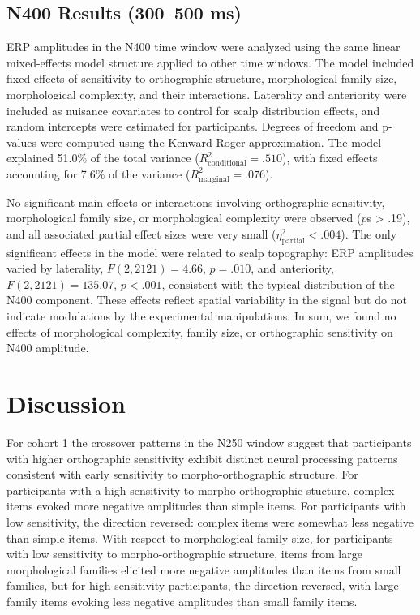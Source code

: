 \documentclass[preprint,12pt, authoryear, review]{elsarticle}
\begin{document}
\subsection{N400 Results (300--500 ms)}


ERP amplitudes in the N400 time window were analyzed using the same linear mixed-effects model structure applied to other time windows. The model included fixed effects of sensitivity to orthographic structure, morphological family size, morphological complexity, and their interactions. Laterality and anteriority were included as nuisance covariates to control for scalp distribution effects, and random intercepts were estimated for participants. Degrees of freedom and p-values were computed using the Kenward-Roger approximation. The model explained 51.0\% of the total variance ($R^2_\text{conditional} = .510$), with fixed effects accounting for 7.6\% of the variance ($R^2_\text{marginal} = .076$).

No significant main effects or interactions involving orthographic sensitivity, morphological family size, or morphological complexity were observed ($p$s > .19), and all associated partial effect sizes were very small ($\eta^2_{\text{partial}} < .004$). The only significant effects in the model were related to scalp topography: ERP amplitudes varied by laterality, $F(2, 2121) = 4.66$, $p = .010$, and anteriority, $F(2, 2121) = 135.07$, $p < .001$, consistent with the typical distribution of the N400 component. These effects reflect spatial variability in the signal but do not indicate modulations by the experimental manipulations. In sum, we found no effects of morphological complexity, family size, or orthographic sensitivity on N400 amplitude.


\section{Discussion}

For cohort 1  the crossover patterns in the N250 window suggest that participants with higher orthographic sensitivity exhibit distinct neural processing patterns consistent with early sensitivity to morpho-orthographic structure. For participants with a high sensitivity to morpho-orthographic stucture, complex items evoked more negative amplitudes than simple items. For participants with low sensitivity, the direction reversed: complex items were somewhat less negative than simple items. With respect to morphological family size, for participants with low sensitivity to morpho-orthographic structure, items from large morphological families elicited more negative amplitudes  than items from small families, but for high sensitivity participants, the direction reversed, with large family items evoking less negative amplitudes than small family items. 
\end{document}
